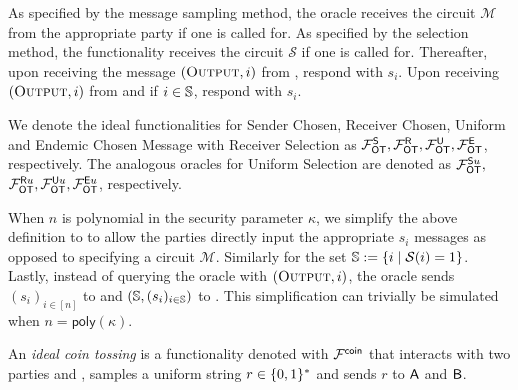 \begin{definition}
	As specified by the message sampling method, the oracle receives the circuit $\mathcal{M}$ from the appropriate party if one is called for.  As specified by the selection method, the functionality receives the circuit $\mathcal{S}$ if one is called for. 
	Thereafter, upon receiving the message $(\textsc{Output}, i)$ from \send, respond with $s_i$. Upon receiving $(\textsc{Output}, i)$ from \rec and if $i\in \mathsf{\mathbb S}$,  respond with $s_i$. 
	
	We denote the ideal functionalities for Sender Chosen, Receiver Chosen, Uniform and Endemic Chosen Message with Receiver Selection as $\mathcal{F}_{\mathsf{OT}}^\mathsf{S}, \mathcal{F}_{\mathsf{OT}}^\mathsf{R},\mathcal{F}_{\mathsf{OT}}^\mathsf{U},\mathcal{F}_{\mathsf{OT}}^\mathsf{E}$, respectively. The analogous oracles for Uniform Selection are denoted as  $\mathcal{F}_{\mathsf{OT}}^{\mathsf{S} u},$ $\mathcal{F}_{\mathsf{OT}}^{\mathsf{R} u}, \mathcal{F}_{\mathsf{OT}}^{\mathsf{U} u}, \mathcal{F}_{\mathsf{OT}}^{\mathsf{E} u}$, respectively.
\end{definition}
\begin{remark}
	When $n$ is polynomial in the security parameter $\kappa$, we simplify the above definition to  to allow the parties directly input the appropriate $s_i$ messages as opposed to specifying a circuit $\mathcal{M}$. Similarly for the set $\mathsf{\mathbb S}:=\{i \mid \mathcal{S}(i)=1\}$. Lastly, instead of querying the oracle with $(\textsc{Output}, i)$, the oracle sends $(s_i)_{i\in [n]}$ to \send and $(\mathsf{\mathbb S}, (s_i)_{i\in\mathsf{\mathbb S}})$ to \rec. This simplification can trivially be simulated when $n=\textsf{poly}(\kappa)$.
\end{remark}



\begin{definition}\label{def:coin}
An \emph{ideal coin tossing} is a functionality denoted with $\mathcal{F}^{\mathsf{coin}}$ that interacts with two parties \A and \B, samples a uniform string $r\in\{0,1\}^*$ and sends $r$ to $\mathsf{A}$ and $\mathsf{B}$.
\end{definition}


